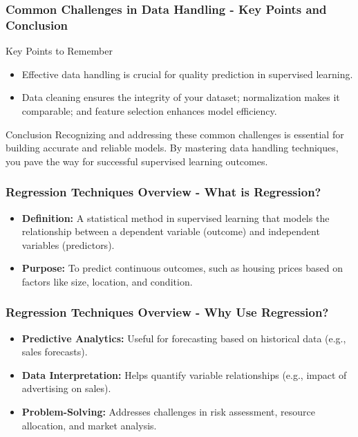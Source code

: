 \documentclass[aspectratio=169]{beamer}
\begin{document}
\begin{frame}[fragile]
    \frametitle{Common Challenges in Data Handling - Key Points and Conclusion}
    \begin{block}{Key Points to Remember}
        \begin{itemize}
            \item Effective data handling is crucial for quality prediction in supervised learning.
            \item Data cleaning ensures the integrity of your dataset; normalization makes it comparable; and feature selection enhances model efficiency.
        \end{itemize}
    \end{block}

    \begin{block}{Conclusion}
        Recognizing and addressing these common challenges is essential for building accurate and reliable models. By mastering data handling techniques, you pave the way for successful supervised learning outcomes.
    \end{block}
\end{frame}

\begin{frame}[fragile]
    \frametitle{Regression Techniques Overview - What is Regression?}
    \begin{itemize}
        \item \textbf{Definition:} A statistical method in supervised learning that models the relationship between a dependent variable (outcome) and independent variables (predictors).
        \item \textbf{Purpose:} To predict continuous outcomes, such as housing prices based on factors like size, location, and condition.
    \end{itemize}
\end{frame}

\begin{frame}[fragile]
    \frametitle{Regression Techniques Overview - Why Use Regression?}
    \begin{itemize}
        \item \textbf{Predictive Analytics:} Useful for forecasting based on historical data (e.g., sales forecasts).
        \item \textbf{Data Interpretation:} Helps quantify variable relationships (e.g., impact of advertising on sales).
        \item \textbf{Problem-Solving:} Addresses challenges in risk assessment, resource allocation, and market analysis.
    \end{itemize}
\end{frame}
\end{document}
